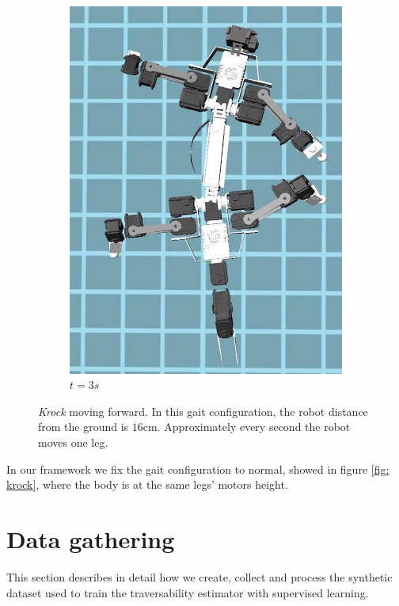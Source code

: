 \documentclass[../document.tex]{subfiles}
\begin{document}
\begin{figure}[htbp]
\begin{subfigure}[b]{0.3\textwidth}
            \includegraphics[width=\textwidth]{../img/krock-moving-3}
            \caption{$t=3s$}
        \end{subfigure}    
    \caption{\emph{Krock} moving forward. In this gait configuration, the robot distance from the ground is $16$cm. Approximately every second the robot moves one leg. }
    \label{fig: krock-moving}
    \end{figure}
In our framework we fix the gait configuration to normal, showed in figure \ref{fig: krock}, where the body is at the same legs' motors height.
\section{Data gathering}
\label{sec: data-gathering}
This section describes in detail how we create, collect and process the synthetic dataset used to train the traversability estimator with supervised learning.
\end{document}
